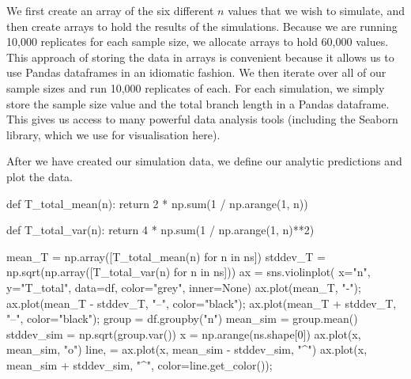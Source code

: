 \documentclass[graybox]{svmult}
\begin{document}
    We first create an array of the six different \(n\) values that we wish to simulate, and then create arrays to hold the results of the
simulations. Because we are running 10,000 replicates for each sample
size, we allocate arrays to hold 60,000 values. This approach of storing
the data in arrays is convenient because it allows us to use Pandas
dataframes in an idiomatic fashion. We then iterate
over all of our sample sizes and run 10,000 replicates of each. For each
simulation, we simply store the sample size value and the total branch
length in a Pandas dataframe. This gives us access to many powerful data analysis tools (including the Seaborn library, which we use for visualisation here).

After we have created our simulation data, we define our analytic
predictions and plot the data.

\begin{pythoncode}
def T_total_mean(n):
    return 2 * np.sum(1 / np.arange(1, n))

def T_total_var(n):
    return 4 * np.sum(1 / np.arange(1, n)**2)

mean_T = np.array([T_total_mean(n) for n in ns])
stddev_T = np.sqrt(np.array([T_total_var(n) for n in ns]))
ax = sns.violinplot(
    x="n", y="T_total", data=df, color="grey", inner=None)
ax.plot(mean_T, "-");
ax.plot(mean_T - stddev_T, "--", color="black");
ax.plot(mean_T + stddev_T, "--", color="black");
group = df.groupby("n")
mean_sim = group.mean()
stddev_sim = np.sqrt(group.var())
x = np.arange(ns.shape[0])
ax.plot(x, mean_sim, "o")
line, = ax.plot(x, mean_sim - stddev_sim, "^")
ax.plot(x, mean_sim + stddev_sim, "^", color=line.get_color());
\end{pythoncode}

\end{document}

